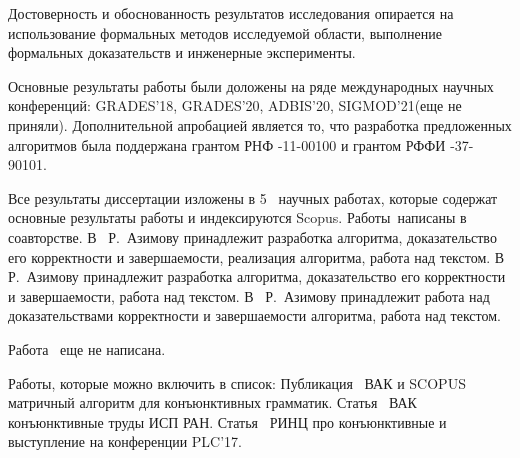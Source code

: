 {\reliability}

Достоверность и обоснованность результатов исследования опирается на использование формальных методов исследуемой области, выполнение формальных доказательств и инженерные эксперименты.

Основные результаты работы были доложены на ряде международных научных конференций: GRADES'18, GRADES'20, ADBIS’20, SIGMOD'21(еще не приняли). Дополнительной апробацией является то, что разработка предложенных алгоритмов была поддержана грантом РНФ -11-00100 и грантом РФФИ -37-90101.


{\publications} Все результаты диссертации изложены в 5~\cite{1,2,3,4,5} научных работах, которые содержат основные результаты работы и индексируются Scopus. Работы~\cite{1,2,3,4}написаны в соавторстве. В~\cite{1} Р.~Азимову принадлежит разработка алгоритма, доказательство его корректности и завершаемости, реализация алгоритма, работа над текстом. В~\cite{2} Р.~Азимову принадлежит разработка алгоритма, доказательство его корректности и завершаемости, работа над текстом. В~\cite{3,4} Р.~Азимову принадлежит работа над доказательствами корректности и завершаемости алгоритма, работа над текстом.
    
Работа~\cite{5} еще не написана.
    
Работы, которые можно включить в список: Публикация~\cite{6} ВАК и SCOPUS матричный алгоритм для конъюнктивных грамматик. Статья~\cite{7} ВАК конъюнктивные труды ИСП РАН. Статья~\cite{8} РИНЦ про конъюнктивные и выступление на конференции PLC'17.


